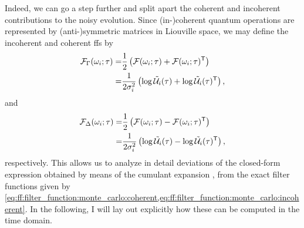 Indeed, we can go a step further and split apart the coherent and incoherent contributions to the noisy evolution.
Since (in-)coherent quantum operations are represented by (anti-)symmetric matrices in Liouville space, we may define the incoherent and coherent \glspl{ff} by
\begin{equation}
    \label{eq:ff:filter_function:monte_carlo:incoherent}
    \begin{split}
        \mathcal{F}_\Gamma(\omega_i;\tau) =& \frac{1}{2}\left(\mathcal{F}(\omega_i;\tau) + \mathcal{F}(\omega_i;\tau)^\mathsf{T}\right) \\
                                     =& \frac{1}{2\sigma_i^2}\left(\log\mathcal{\tilde{U}}_i(\tau) + \log\mathcal{\tilde{U}}_i(\tau)^\mathsf{T}\right),
    \end{split}
\end{equation}
and
\begin{equation}
    \label{eq:ff:filter_function:monte_carlo:coherent}
    \begin{split}
        \mathcal{F}_\Delta(\omega_i;\tau) =& \frac{1}{2}\left(\mathcal{F}(\omega_i;\tau) - \mathcal{F}(\omega_i;\tau)^\mathsf{T}\right) \\
                                     =& \frac{1}{2\sigma_i^2}\left(\log\mathcal{\tilde{U}}_i(\tau) - \log\mathcal{\tilde{U}}_i(\tau)^\mathsf{T}\right),
    \end{split}
\end{equation}
respectively.
This allows us to analyze in detail deviations of the closed-form expression obtained by means of the cumulant expansion , from the exact filter functions given by \cref{eq:ff:filter_function:monte_carlo:coherent,eq:ff:filter_function:monte_carlo:incoherent}.
In the following, I will lay out explicitly how these can be computed in the time domain.

